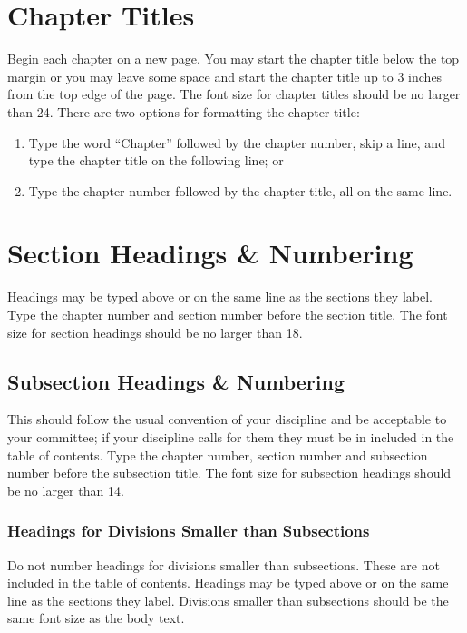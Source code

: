 \section{Chapter Titles}

Begin each chapter on a new page.
You may start the chapter title below the top margin or you may leave some space and start the chapter title up to 3 inches from the top edge of the page.
The font size for chapter titles should be no larger than 24.
There are two options for formatting the chapter title:

\begin{enumerate}
	\item Type the word ``Chapter'' followed by the chapter number, skip a line, and type the chapter title on the following line; or
	\item Type the chapter number followed by the chapter title, all on the same line.
\end{enumerate}

\section{Section Headings \& Numbering}

Headings may be typed above or on the same line as the sections they label.
Type the chapter number and section number before the section title.
The font size for section headings should be no larger than 18.

\subsection{Subsection Headings \& Numbering}
\label{subsec:subsection-headings-numbering}

This should follow the usual convention of your discipline and be acceptable to your committee; if your discipline calls for them they must be in included in the table of contents.
Type the chapter number, section number and subsection number before the subsection title.
The font size for subsection headings should be no larger than 14.

\subsubsection{Headings for Divisions Smaller than Subsections}

Do not number headings for divisions smaller than subsections.
These are not included in the table of contents.
Headings may be typed above or on the same line as the sections they label.
Divisions smaller than subsections should be the same font size as the body text.

